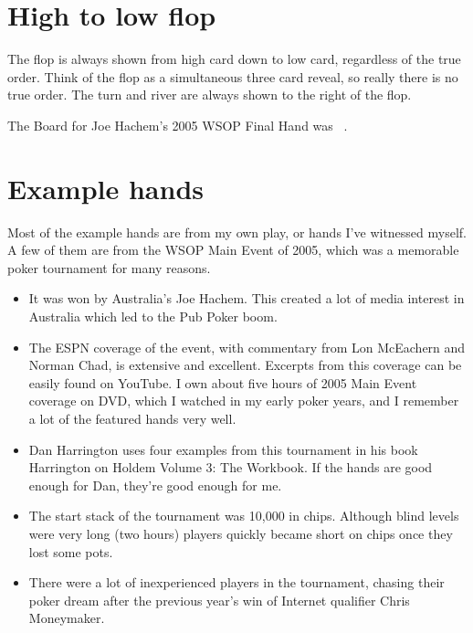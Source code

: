 \section*{High to low flop}

The flop is always shown from high card down to low card,
regardless of the true order. Think of the flop as a
simultaneous three card reveal, so really there is no true order. The turn
and river are always shown to the right of the flop.

The Board for Joe Hachem's 2005 WSOP Final Hand was
\sixh\fived\fourd\As\fourc\ .



\section*{Example hands}

Most of the example hands are from my own play, or hands I've
witnessed myself. A few of them are from the WSOP Main Event
of 2005, which was a memorable poker tournament for many reasons.

\begin{itemize}
  \item It was won by Australia's Joe Hachem. This created a lot of
    media interest in Australia which led to the Pub Poker boom.
  \item The ESPN coverage of the event, with commentary from
    Lon McEachern and Norman Chad, is extensive and
    excellent. Excerpts from this coverage can be easily found on
    YouTube. I own about five hours of 2005 Main Event coverage on
    DVD, which I watched in my early poker years, and I remember a lot
    of the featured hands very well.
  \item Dan Harrington uses four examples from this tournament in his
    book Harrington on Holdem Volume 3: The Workbook. If the hands are
    good enough for Dan, they're good enough for me.
  \item The start stack of the tournament was 10,000 in
    chips. Although blind levels were very long (two hours)
    players quickly became short on chips once they lost some pots.
  \item There were a lot of inexperienced players in the tournament,
    chasing their poker dream after the previous year's win of
    Internet qualifier Chris Moneymaker.
\end{itemize}

